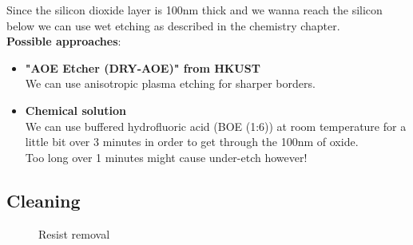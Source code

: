 Since the silicon dioxide layer is 100nm thick and we wanna reach the silicon below we can use wet etching as described in the chemistry chapter.\\

\textbf{Possible approaches}:
\begin{itemize}
	\item \textbf{"AOE Etcher (DRY-AOE)" from HKUST} \\
	We can use anisotropic plasma etching for sharper borders.
	\item \textbf{Chemical solution} \\
	We can use buffered hydrofluoric acid (BOE (1:6)) at room temperature for a little bit over 3 minutes in order to get through the 100nm of oxide.\\
	Too long over 1 minutes might cause under-etch however!
\end{itemize}

\subsection{Cleaning}
\begin{figure}[H]
	\centering
	\begin{tikzpicture}[node distance = 3cm, auto, thick,scale=\CrossSectionOnly, every node/.style={transform shape}]
		
	\end{tikzpicture}
	\drawStepArrow{}
	\begin{tikzpicture}[node distance = 3cm, auto, thick,scale=\CrossSectionOnly, every node/.style={transform shape}]
		
	\end{tikzpicture}
	\caption{Resist removal}
\end{figure}
